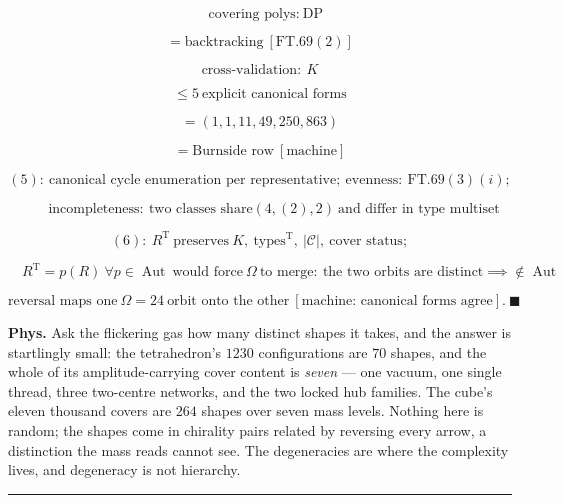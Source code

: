 \begin{theorem}
\[
\quad\text{covering polys}:\ \text{DP}
\]

\[
= \text{backtracking}\ [\mathrm{FT.69}(2)]
\]

\[
\text{cross-validation}:\ K
\]

\[
\le 5\ \text{explicit canonical forms}
\]

\[
= (1,1,11,49,250,863)
\]

\[
= \text{Burnside row}\ [\text{machine}]
\]

\[
(5):\ \text{canonical cycle enumeration per representative};\ \text{evenness}:\ \mathrm{FT.69}(3)(i);
\]

\[
\qquad \text{incompleteness}:\ \text{two classes share}(4,(2),2)\ \text{and differ in type multiset}
\]

\[
(6):\ R^{\mathrm T}\ \text{preserves}\ K,\ \text{types}^{\mathrm T},\ |\mathcal C|,\ \text{cover status};
\]

\[
\quad R^{\mathrm T}=p(R)\ \forall p\in\operatorname{Aut}\ \text{would force}\ \Omega\ \text{to merge}:\ \text{the two orbits are distinct}\implies\notin\operatorname{Aut}
\]

\[
\text{reversal maps one}\ \Omega{=}24\ \text{orbit onto the other}\ [\text{machine: canonical forms agree}].\ \blacksquare
\]

\textbf{Phys.} Ask the flickering gas how many distinct shapes it takes, and the answer is startlingly small: the tetrahedron's $1230$ configurations are $70$ shapes, and the whole of its amplitude-carrying cover content is \textit{seven} — one vacuum, one single thread, three two-centre networks, and the two locked hub families. The cube's eleven thousand covers are $264$ shapes over seven mass levels. Nothing here is random; the shapes come in chirality pairs related by reversing every arrow, a distinction the mass reads cannot see. The degeneracies are where the complexity lives, and degeneracy is not hierarchy.

\vspace{2pt}\noindent\rule{\textwidth}{0.4pt}\vspace{2pt}

\end{theorem}

